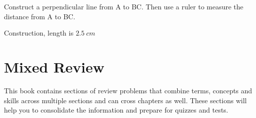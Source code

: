 \begin{exercises}
	\bigskip
	\medskip
	
	\begin{ex}
	Construct a perpendicular line from \pnt A to \lin BC.  Then use a ruler to measure the distance from \pnt A to \lin BC.\\  

\begin{center}
\end{center}

	\begin{sol}
	Construction, length is $2.5~cm$
	\end{sol}
	\end{ex}
\end{exercises}	
		
\section{Mixed Review}	

This book contains sections of review problems that combine terms, concepts and skills across multiple sections and can cross chapters as well.  These sections will help you to consolidate the information and prepare for quizzes and tests.

